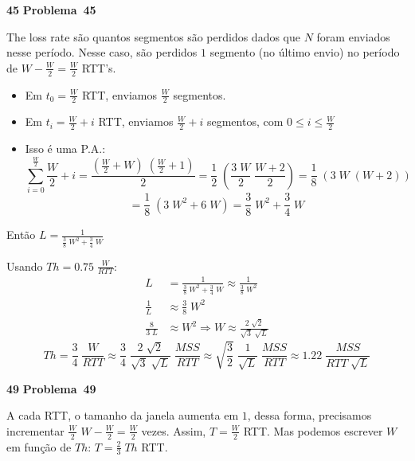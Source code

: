 \documentclass{article}
\newcounter{exe-list}
\newenvironment{exe-list}
    {\begin{list}{\alph{exe-list}.}{\usecounter{exe-list}}}
    {\end{list}}
\newenvironment{exe}[2][Problema]
    {\newcommand{\opt}{(Opcional)}%
    \newcommand{\sketch}[1]{{\bfseries Rascunho:} ##1}%
    \medskip\par\noindent\ifthenelse{\equal{#1}{}}
        {\textbf{\large #2}}
        {\textbf{\large #1~#2}}%
    \medskip\par\noindent}
    {\medskip}
\begin{document}
\begin{exe}{45}
    \begin{exe-list}
    \item The loss rate são quantos segmentos são
        perdidos dados que \(N\) foram enviados nesse período.
        Nesse caso, são perdidos \(1\) segmento (no último envio)
        no período de \(W - \frac{W}{2} = \frac{W}{2}\) RTT's.
        \begin{itemize}
            \item Em \(t_0 = \frac{W}{2}\) RTT,
                enviamos \(\frac{W}{2}\) segmentos.
            \item Em \(t_i = \frac{W}{2} + i\) RTT,
                enviamos \(\frac{W}{2} + i\) segmentos,
                com \(0 \le i \le \frac{W}{2}\)
            \item Isso é uma P.A.:
                \[
                    \sum_{i = 0}^{\frac{W}{2}} \frac{W}{2} + i
                    = \frac{(\frac{W}{2} + W) \; (\frac{W}{2} + 1)}{2}
                    = \frac12 \; \left( \frac{3 \; W}{2} \; \frac{W + 2}{2} \right)
                    = \frac18 \; \left( 3 \; W \; (W + 2) \right)
                \] \[
                    = \frac18 \; \left( 3 \; W^2 + 6 \; W \right)
                    = \frac38 \; W^2 + \frac34 \; W
                \]
        \end{itemize}
        Então \(L = \frac{1}{\frac38 \; W^2 + \frac34 \; W}\)
    \item Usando \(Th = 0.75 \; \frac{W}{RTT}\):
        \begin{align*}
            L &= \frac{1}{\frac38 \; W^2 + \frac34 \; W}
                \approx \frac{1}{\frac38 \; W^2} \\
            \frac{1}{L} &\approx \frac38 \; W^2 \\
            \frac{8}{3 \; L} &\approx W^2 \Longrightarrow
                W \approx \frac{2 \; \sqrt{2}}{\sqrt{3} \; \sqrt{L}}
        \end{align*}
        \[
            Th = \frac34 \; \frac{W}{RTT}
            \approx \frac34 \; \frac{2 \; \sqrt{2}}{\sqrt{3} \; \sqrt{L}} \; \frac{MSS}{RTT}
            \approx \sqrt{\frac32} \; \frac{1}{\sqrt{L}} \; \frac{MSS}{RTT}
            \approx 1.22 \; \frac{MSS}{RTT \; \sqrt{L}}
        \]
    \end{exe-list}
\end{exe}

\begin{exe}{49}
    A cada RTT, o tamanho da janela aumenta em \(1\),
    dessa forma, precisamos incrementar \(\frac{W}{2}\)
    \(W - \frac{W}{2} = \frac{W}{2}\) vezes.
    Assim, \(T = \frac{W}{2}\) RTT.
    Mas podemos escrever \(W\) em função de \(Th\):
    \(T = \frac23 \; Th\) RTT.
\end{exe}
\end{document}
